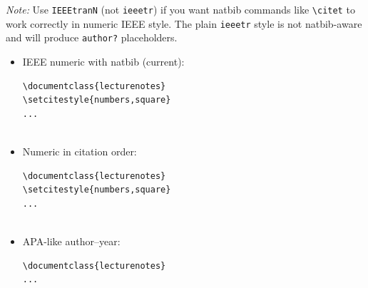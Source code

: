 \documentclass{lecturenotes}
\begin{document}
\noindent
\textit{Note:} Use \texttt{IEEEtranN} (not \texttt{ieeetr}) if you want natbib commands like \verb|\citet| to work correctly in numeric IEEE style. The plain \texttt{ieeetr} style is not natbib-aware and will produce \texttt{author?} placeholders.


\begin{itemize}
    \item IEEE numeric with natbib (current):
\begin{verbatim}
\documentclass{lecturenotes}
\setcitestyle{numbers,square}
...


\end{verbatim}
    \item Numeric in citation order:
\begin{verbatim}
\documentclass{lecturenotes}
\setcitestyle{numbers,square}
...


\end{verbatim}
    \item APA-like author–year:
\begin{verbatim}
\documentclass{lecturenotes}
...


\end{verbatim}
\end{itemize}






\end{document}
